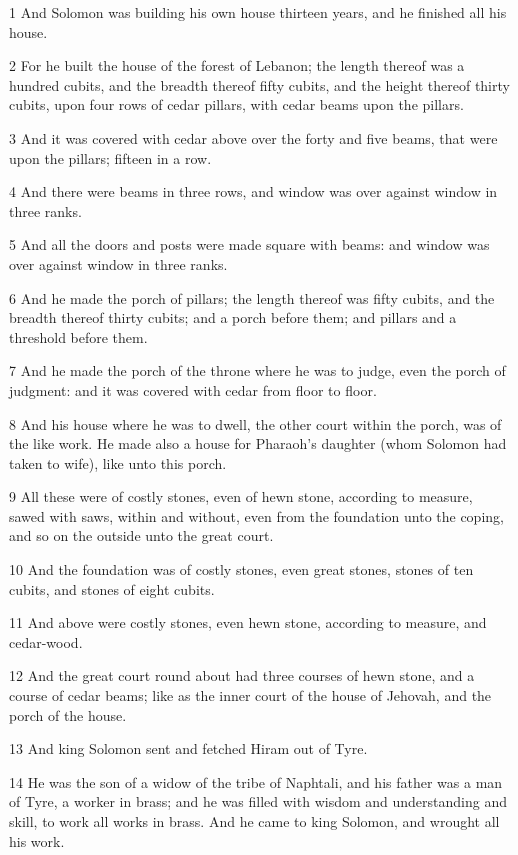 \par 1 And Solomon was building his own house thirteen years, and he finished all his house.
\par 2 For he built the house of the forest of Lebanon; the length thereof was a hundred cubits, and the breadth thereof fifty cubits, and the height thereof thirty cubits, upon four rows of cedar pillars, with cedar beams upon the pillars.
\par 3 And it was covered with cedar above over the forty and five beams, that were upon the pillars; fifteen in a row.
\par 4 And there were beams in three rows, and window was over against window in three ranks.
\par 5 And all the doors and posts were made square with beams: and window was over against window in three ranks.
\par 6 And he made the porch of pillars; the length thereof was fifty cubits, and the breadth thereof thirty cubits; and a porch before them; and pillars and a threshold before them.
\par 7 And he made the porch of the throne where he was to judge, even the porch of judgment: and it was covered with cedar from floor to floor.
\par 8 And his house where he was to dwell, the other court within the porch, was of the like work. He made also a house for Pharaoh's daughter (whom Solomon had taken to wife), like unto this porch.
\par 9 All these were of costly stones, even of hewn stone, according to measure, sawed with saws, within and without, even from the foundation unto the coping, and so on the outside unto the great court.
\par 10 And the foundation was of costly stones, even great stones, stones of ten cubits, and stones of eight cubits.
\par 11 And above were costly stones, even hewn stone, according to measure, and cedar-wood.
\par 12 And the great court round about had three courses of hewn stone, and a course of cedar beams; like as the inner court of the house of Jehovah, and the porch of the house.
\par 13 And king Solomon sent and fetched Hiram out of Tyre.
\par 14 He was the son of a widow of the tribe of Naphtali, and his father was a man of Tyre, a worker in brass; and he was filled with wisdom and understanding and skill, to work all works in brass. And he came to king Solomon, and wrought all his work.
